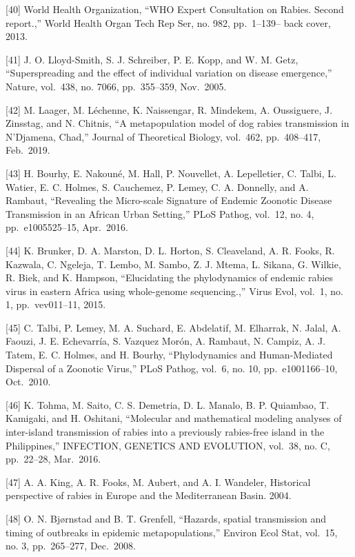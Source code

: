 \documentclass[
]{book}
\begin{document}
{[}40{]} World Health Organization, ``WHO Expert Consultation on Rabies. Second report.,'' World Health Organ Tech Rep Ser, no. 982, pp.~1--139-- back cover, 2013.

{[}41{]} J. O. Lloyd-Smith, S. J. Schreiber, P. E. Kopp, and W. M. Getz, ``Superspreading and the effect of individual variation on disease emergence,'' Nature, vol.~438, no. 7066, pp.~355--359, Nov.~2005.

{[}42{]} M. Laager, M. Léchenne, K. Naissengar, R. Mindekem, A. Oussiguere, J. Zinsstag, and N. Chitnis, ``A metapopulation model of dog rabies transmission in N'Djamena, Chad,'' Journal of Theoretical Biology, vol.~462, pp.~408--417, Feb.~2019.

{[}43{]} H. Bourhy, E. Nakouné, M. Hall, P. Nouvellet, A. Lepelletier, C. Talbi, L. Watier, E. C. Holmes, S. Cauchemez, P. Lemey, C. A. Donnelly, and A. Rambaut, ``Revealing the Micro-scale Signature of Endemic Zoonotic Disease Transmission in an African Urban Setting,'' PLoS Pathog, vol.~12, no. 4, pp.~e1005525--15, Apr.~2016.

{[}44{]} K. Brunker, D. A. Marston, D. L. Horton, S. Cleaveland, A. R. Fooks, R. Kazwala, C. Ngeleja, T. Lembo, M. Sambo, Z. J. Mtema, L. Sikana, G. Wilkie, R. Biek, and K. Hampson, ``Elucidating the phylodynamics of endemic rabies virus in eastern Africa using whole-genome sequencing.,'' Virus Evol, vol.~1, no. 1, pp.~vev011--11, 2015.

{[}45{]} C. Talbi, P. Lemey, M. A. Suchard, E. Abdelatif, M. Elharrak, N. Jalal, A. Faouzi, J. E. Echevarría, S. Vazquez Morón, A. Rambaut, N. Campiz, A. J. Tatem, E. C. Holmes, and H. Bourhy, ``Phylodynamics and Human-Mediated Dispersal of a Zoonotic Virus,'' PLoS Pathog, vol.~6, no. 10, pp.~e1001166--10, Oct.~2010.

{[}46{]} K. Tohma, M. Saito, C. S. Demetria, D. L. Manalo, B. P. Quiambao, T. Kamigaki, and H. Oshitani, ``Molecular and mathematical modeling analyses of inter-island transmission of rabies into a previously rabies-free island in the Philippines,'' INFECTION, GENETICS AND EVOLUTION, vol.~38, no. C, pp.~22--28, Mar.~2016.

{[}47{]} A. A. King, A. R. Fooks, M. Aubert, and A. I. Wandeler, Historical perspective of rabies in Europe and the Mediterranean Basin. 2004.

{[}48{]} O. N. Bjørnstad and B. T. Grenfell, ``Hazards, spatial transmission and timing of outbreaks in epidemic metapopulations,'' Environ Ecol Stat, vol.~15, no. 3, pp.~265--277, Dec.~2008.
\end{document}
